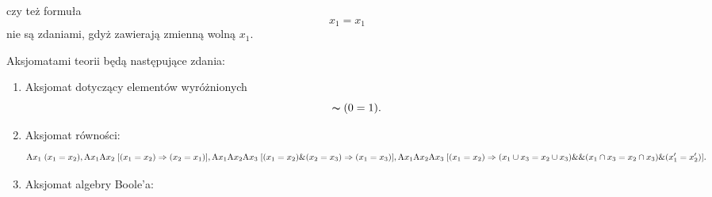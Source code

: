 \documentclass[b5paper,8 pt,leqno]{book}
\begin{document}
czy też formuła 
\begin{equation*}
	x_1 = x_1
\end{equation*}
nie są zdaniami, gdyż zawierają zmienną wolną $x_1$.

\indent Aksjomatami teorii będą następujące zdania:
\begin{enumerate}
	\item Aksjomat dotyczący elementów wyróżnionych
	\begin{equation*}
	\thicksim (0 = 1).
	\end{equation*}
	
	\item Aksjomat równości:
	\begin{equation*}
	\textrm{A}x_1 \; (x_1 = x_2), \\
	\textrm{A}x_1\textrm{A}x_2 \; [(x_1 = x_2) \Rightarrow (x_2 = x_1)],
	\textrm{A}x_1\textrm{A}x_2\textrm{A}x_3 \; [(x_1 = x_2) \& (x_2 = x_3) \Rightarrow (x_1 = x_3)],
	\textrm{A}x_1\textrm{A}x_2\textrm{A}x_3 \; [(x_1 = x_2) \Rightarrow {(x_1 \cup x_3 = x_2 \cup x_3) \& \& (x_1 \cap x_3 = x_2 \cap x_3) \& (x_1'=x_2')}].
	\end{equation*}
	
	\item Aksjomat algebry Boole'a:
	
\end{enumerate}
\end{document}
